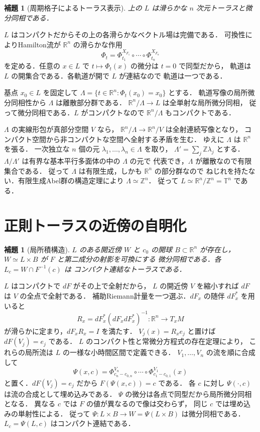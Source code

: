 \documentclass[a5paper,10pt,onecolumn]{jsarticle}
\makeatletter
\theoremstyle{mathnotetheorem}
\newtheorem{lemma}[theorem]{補題}
\renewcommand{\proofname}{証明}
\renewenvironment{proof}[1][\proofname]{%
  \par\pushQED{\qed}\normalfont\topsep4\p@\@plus2\p@\relax
  \trivlist\item[\hskip\labelsep\bfseries #1]\ignorespaces
}{\popQED\endtrivlist\@endpefalse}
\makeatother
\begin{document}
\begin{lemma}[周期格子によるトーラス表示]
上の $L$ は滑らかな $n$ 次元トーラスと微分同相である．
\end{lemma}
\begin{proof}
$L$ はコンパクトだからその上の各滑らかなベクトル場は完備である．
可換性によりHamilton流が $\mathbb R^n$ の滑らかな作用
\[
 \Phi_t=\Phi_{t_1}^{X_{F_1}}\circ\cdots\circ
                \Phi_{t_n}^{X_{F_n}}
\]
を定める．任意の $x\in L$ で
$t\mapsto\Phi_t(x)$ の微分は $t=0$ で同型だから，
軌道は $L$ の開集合である．各軌道が開で $L$ が連結なので
軌道は一つである．

基点 $x_0\in L$ を固定して
$\Lambda=\{t\in\mathbb R^n:\Phi_t(x_0)=x_0\}$ とする．
軌道写像の局所微分同相性から $\Lambda$ は離散部分群である．
$\mathbb R^n/\Lambda\to L$ は全単射な局所微分同相，
従って微分同相である．$L$ がコンパクトなので
$\mathbb R^n/\Lambda$ もコンパクトである．

$\Lambda$ の実線形包が真部分空間 $V$ なら，
$\mathbb R^n/\Lambda\to\mathbb R^n/V$ は全射連続写像となり，
コンパクト空間から非コンパクトな空間へ全射する矛盾を生む．
ゆえに $\Lambda$ は $\mathbb R^n$ を張る．
一次独立な $n$ 個の元 $\lambda_1,\ldots,\lambda_n\in\Lambda$ を取り，
$\Lambda'=\sum_j\mathbb Z\lambda_j$ とする．
$\Lambda/\Lambda'$ は有界な基本平行多面体の中の $\Lambda$ の元で
代表でき，$\Lambda$ が離散なので有限集合である．
従って $\Lambda$ は有限生成，しかも $\mathbb R^n$ の部分群なので
ねじれを持たない．有限生成Abel群の構造定理により
$\Lambda\simeq\mathbb Z^n$．
従って $L\simeq\mathbb R^n/\mathbb Z^n=\mathbb T^n$ である．
\end{proof}

\section{正則トーラスの近傍の自明化}
\begin{lemma}[局所積構造]
$L$ のある開近傍 $W$ と $c_0$ の開球 $B\subset\mathbb R^n$ が存在し，
$W\simeq L\times B$ が $F$ と第二成分の射影を可換にする
微分同相である．各 $L_c=W\cap F^{-1}(c)$ は
コンパクト連結なトーラスである．
\end{lemma}
\begin{proof}
$L$ はコンパクトで $dF$ がその上で全射だから，
$L$ の開近傍 $V$ を縮小すれば $dF$ は $V$ の全点で全射である．
補助Riemann計量を一つ選ぶ．$dF_x$ の随伴 $dF_x^*$ を用いると
\[
 R_x=dF_x^*(dF_xdF_x^*)^{-1}:\mathbb R^n\to T_xM
\]
が滑らかに定まり，$dF_xR_x=I$ を満たす．
$V_j(x)=R_xe_j$ と置けば $dF(V_j)=e_j$ である．
$L$ のコンパクト性と常微分方程式の存在定理により，
これらの局所流は $L$ の一様な小時間区間で定義できる．
$V_1,\ldots,V_n$ の流を順に合成して
\[
 \Psi(x,c)=\Phi_{c_n-c_{0,n}}^{V_n}\circ\cdots\circ
   \Phi_{c_1-c_{0,1}}^{V_1}(x)
\]
と置く．$dF(V_j)=e_j$ だから
$F(\Psi(x,c))=c$ である．
各 $c$ に対し $\Psi(\cdot,c)$ は流の合成として埋め込みである．
$\Psi$ の微分は各点で同型だから局所微分同相となる．
異なる $c$ では $F$ の値が異なるので像は交わらず，
同じ $c$ では埋め込みの単射性による．
従って $\Psi:L\times B\to W=\Psi(L\times B)$ は微分同相である．
$L_c=\Psi(L,c)$ はコンパクト連結である．
\end{proof}
\end{document}
